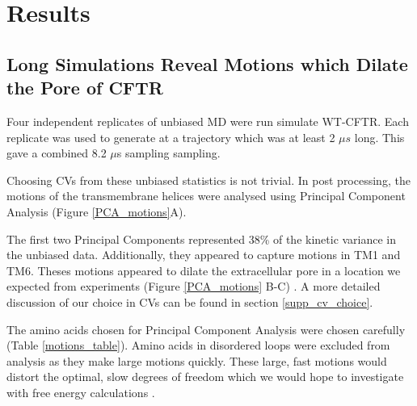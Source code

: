 \section{Results}

\subsection{Long Simulations Reveal Motions which Dilate the Pore of CFTR}
Four independent replicates of unbiased MD were run simulate WT-CFTR. Each replicate was used to generate at a trajectory which was at least 2 $\mu s$ long. This gave a combined 8.2 $\mu$s sampling sampling. 

Choosing CVs from these unbiased statistics is not trivial. In post processing, the motions of the transmembrane helices were analysed using Principal Component Analysis \cite{pearson1901, hotelling1936} (Figure \ref{PCA_motions}A). 

The first two Principal Components represented 38\% of the kinetic variance in the unbiased data. Additionally, they appeared to capture motions in TM1 and TM6. Theses motions appeared to dilate the extracellular pore in a location we expected from experiments (Figure \ref{PCA_motions} B-C) \cite{linsdell2018, negoda2018, negoda2019}. A more detailed discussion of our choice in CVs can be found in section \ref{supp_cv_choice}. 

The amino acids chosen for Principal Component Analysis were chosen carefully (Table \ref{motions_table}). Amino acids in disordered loops were excluded from analysis as they make large motions quickly. These large, fast motions would distort the optimal, slow degrees of freedom which we would hope to investigate with free energy calculations \cite{noe2001}. 

